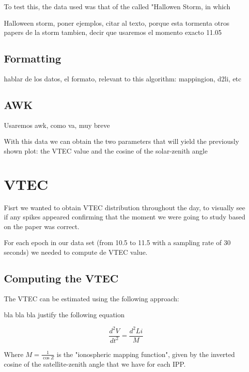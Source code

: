To test this, the data used was that of the called "Hallowen Storm, in which 

Halloween storm, poner ejemplos, citar al texto, porque esta tormenta otros papers de la storm tambien, decir que usaremos el momento exacto 11.05

\subsection{Formatting}
hablar de los datos, el formato, relevant to this algorithm: mappingion, d2li, etc

\subsection{AWK}

Usaremos awk, como va, muy breve




With this data we can obtain the two parameters that will yield the previously shown plot: the VTEC value and the cosine of the solar-zenith angle

\section{VTEC}

Fisrt we wanted to obtain VTEC distribution throughout the day, to visually see if any spikes appeared confirming that the moment we were going to study based on the paper \cite{hernandez2012gnss} was correct.

For each epoch in our data set (from 10.5 to 11.5 with a sampling rate of 30 seconds) we needed to compute de VTEC value.

\subsection{Computing the VTEC}

The VTEC can be estimated using the following approach:

bla bla bla justify the following equation

\begin{equation} \label{eq:1}
	\frac{d^{2}V}{dt^{2}} = \frac{d^{2}Li}{M}
\end{equation}

Where $M=\frac{1}{\cos Z}$ is the "ionospheric mapping function", given by the inverted cosine of the satellite-zenith angle that we have for each IPP. \cite{hernandez2012gnss}

